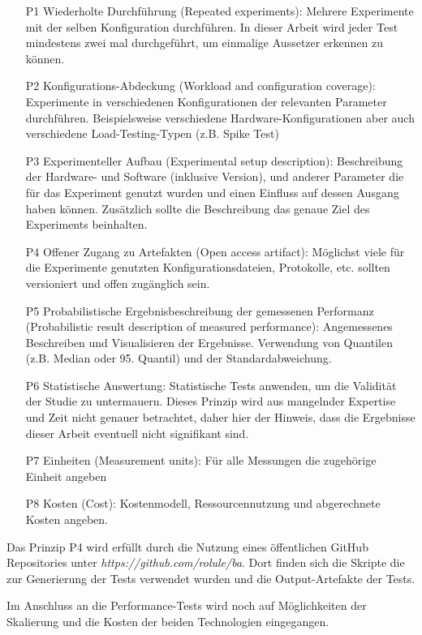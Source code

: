\begin{enumerate}
    \item[P1] Wiederholte Durchführung (Repeated experiments): Mehrere Experimente mit der selben Konfiguration durchführen. In dieser Arbeit wird jeder Test mindestens zwei mal durchgeführt, um einmalige Aussetzer erkennen zu können.
    \item[P2] Konfigurations-Abdeckung (Workload and configuration coverage): Experimente in verschiedenen Konfigurationen der relevanten Parameter durchführen. Beispielsweise verschiedene Hardware-Konfigurationen aber auch verschiedene Load-Testing-Typen (z.B. Spike Test)
    \item[P3] Experimenteller Aufbau (Experimental setup description): Beschreibung der Hardware- und Software (inklusive Version), und anderer Parameter die für das Experiment genutzt wurden und einen Einfluss auf dessen Ausgang haben können. Zusätzlich sollte die Beschreibung das genaue Ziel des Experiments beinhalten.
    \item[P4] Offener Zugang zu Artefakten (Open access artifact): Möglichst viele für die Experimente genutzten Konfigurationsdateien, Protokolle, etc. sollten versioniert und offen zugänglich sein.
    \item[P5] Probabilistische Ergebnisbeschreibung der gemessenen Performanz (Probabilistic result description of measured performance): Angemessenes Beschreiben und Visualisieren der Ergebnisse. Verwendung von Quantilen (z.B. Median oder 95. Quantil) und der Standardabweichung.
    \item[P6] Statistische Auswertung: Statistische Tests anwenden, um die Validität der Studie zu untermauern. Dieses Prinzip wird aus mangelnder Expertise und Zeit nicht genauer betrachtet, daher hier der Hinweis, dass die Ergebnisse dieser Arbeit eventuell nicht signifikant sind.
    \item[P7] Einheiten (Measurement units): Für alle Messungen die zugehörige Einheit angeben
    \item[P8] Kosten (Cost): Kostenmodell, Ressourcennutzung und abgerechnete Kosten angeben.
\end{enumerate}

Das Prinzip P4 wird erfüllt durch die Nutzung eines öffentlichen GitHub Repositories unter \textit{https://github.com/rolule/ba}. Dort finden sich die Skripte die zur Generierung der Tests verwendet wurden und die Output-Artefakte der Tests.

Im Anschluss an die Performance-Tests wird noch auf Möglichkeiten der Skalierung und die Kosten der beiden Technologien eingegangen.


